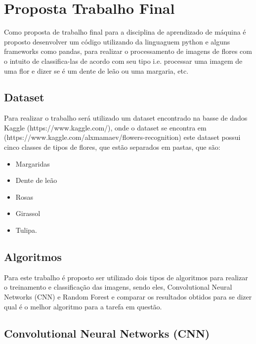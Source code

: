 \chapter{Proposta Trabalho Final}\label{cap_intro}

Como proposta de trabalho final para a disciplina de aprendizado de máquina é proposto desenvolver um código utilizando da linguaguem python e alguns frameworks como pandas, para realizar o processamento de imagens de flores com o intuito de classifica-las de acordo com seu tipo i.e. processar uma imagem de uma flor e dizer se é um dente de leão ou uma margaria, etc.

\section{Dataset}

Para realizar o trabalho será utilizado um dataset encontrado na basse de dados Kaggle (https://www.kaggle.com/), onde o dataset se encontra em 
(https://www.kaggle.com/alxmamaev/flowers-recognition)
 este dataset possui cinco classes de tipos de flores, que estão separados em pastas, que são:

\begin{itemize}
	\item Margaridas
	
	\item Dente de leão
	
	\item Rosas
	
	\item Girassol

	\item Tulipa.	
\end{itemize}

\section{Algoritmos}

Para este trabalho é proposto ser utilizado dois tipos de algoritmos para realizar o treinamento e classificação das imagens, sendo eles, Convolutional Neural Networks (CNN) e Random Forest e comparar os resultados obtidos para se dizer qual é o melhor algoritmo para a tarefa em questão.

\section{Convolutional Neural Networks (CNN)}

